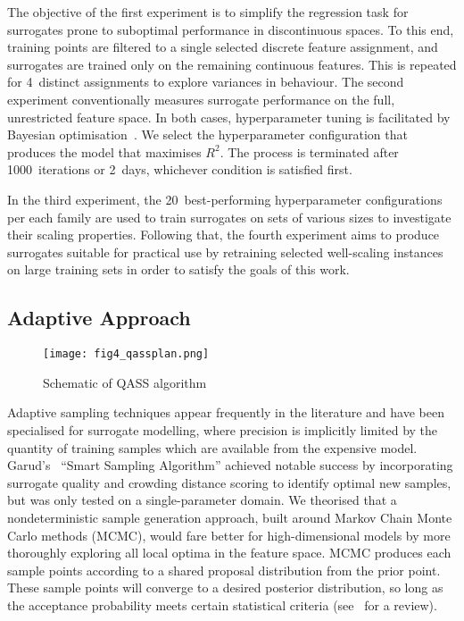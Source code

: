 The objective of the first experiment is to simplify the regression task for
surrogates prone to suboptimal performance in discontinuous spaces.
To this end, training points are filtered to a single selected discrete feature
assignment, and surrogates are trained only on the remaining continuous features.
This is repeated for 4~distinct assignments to explore variances in behaviour.
The second experiment conventionally measures surrogate performance on the full,
unrestricted feature space. In both cases, hyperparameter tuning is
facilitated by Bayesian optimisation~\cite{movckus1975bayesian}. We select the
hyperparameter configuration that produces the model that maximises $R^2$. The
process is terminated after 1000~iterations or
2~days, whichever condition is satisfied first.

In the third experiment, the 20~best-performing hyperparameter configurations
per each family are used to train surrogates on sets of various sizes to
investigate their scaling properties. Following that, the fourth experiment aims
to produce surrogates suitable for practical use by retraining selected
well-scaling instances on large training sets in order to satisfy the goals of this work.


\subsection{Adaptive Approach}\label{sec:adaptive}

\begin{figure}
	\centering
	\texttt{[image: fig4\_qassplan.png]}
	\caption{\label{fig:qassplan}Schematic of QASS algorithm}
\end{figure}

Adaptive sampling techniques appear frequently in the literature and have been specialised for surrogate modelling, where precision is implicitly limited by the quantity of training samples which are available from the expensive model. Garud's~\cite{Garud2016} ``Smart Sampling Algorithm'' achieved notable success by incorporating surrogate quality and
crowding distance scoring to identify optimal new samples, but was only tested
on a single-parameter domain. We theorised that a nondeterministic sample
generation approach, built around Markov Chain Monte Carlo methods (MCMC), would
fare better for high-dimensional models by more thoroughly exploring all local
optima in the feature space. MCMC produces each sample points according to a shared proposal
distribution from the prior point. These sample points will converge to a desired posterior
distribution, so long as the acceptance probability meets certain statistical criteria (see~\cite{Zhou2018} for a review).

